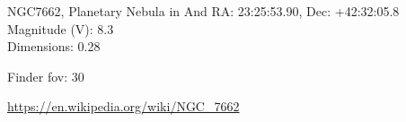 \begin{block}{NGC7662, Planetary Nebula in And}
    RA: 23:25:53.90, Dec: +42:32:05.8 \\ 
    Magnitude (V): 8.3 \\ 
    Dimensions: 0.28 

    Finder fov: 30 

    \url{https://en.wikipedia.org/wiki/NGC_7662} 
\end{block}